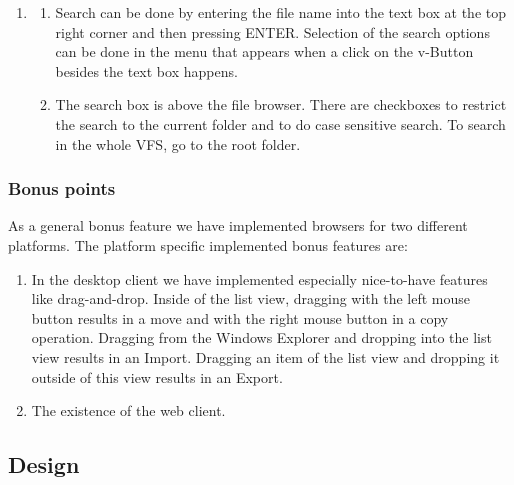 \documentclass[a4paper,12pt]{article}
\begin{document}
\begin{enumerate}
\begin{enumerate} [label={(\alph*)}]
		\item Single click on a folder to enter it, click the up button to go to the parent folder.
		\end{enumerate}
	\item
		\begin{enumerate} [label={(\alph*)}]
		\item Search can be done by entering the file name into the text box at the top right corner and then pressing ENTER. Selection of the search options can be done in the menu that appears when a click on the v-Button besides the text box happens.
		\item The search box is above the file browser. There are checkboxes to restrict the search to the current folder and to do case sensitive search. To search in the whole VFS, go to the root folder.
		\end{enumerate}
\end{enumerate}

\subsubsection{Bonus points}
As a general bonus feature we have implemented browsers for two different platforms. The platform specific implemented bonus features are:
		\begin{enumerate} [label={(\alph*)}]
		\item In the desktop client we have implemented especially nice-to-have features like drag-and-drop. Inside of the list view, dragging with the left mouse button results in a move and with the right mouse button in a copy operation. Dragging from the Windows Explorer and dropping into the list view results in an Import. Dragging an item of the list view and dropping it outside of this view results in an Export.
		\item The existence of the web client.
		\end{enumerate}

\subsection{Design}
\end{document}
